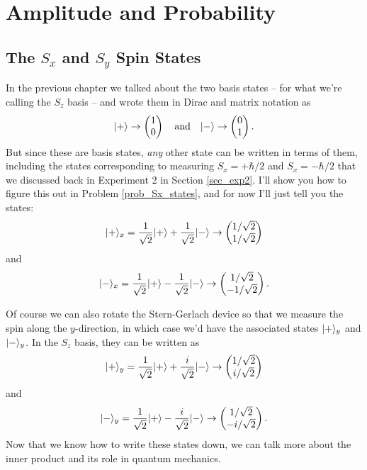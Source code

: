 \chapter{Amplitude and Probability}

\section{The $S_x$ and $S_y$ Spin States}

In the previous chapter we talked about the two basis states -- for what we're calling the $S_z$ basis -- and wrote them in Dirac and matrix notation as
\begin{equation}
| + \rangle \to \begin{pmatrix} 1 \\ 0 \end{pmatrix} \quad \text{and} \quad | - \rangle \to \begin{pmatrix} 0 \\ 1 \end{pmatrix}.
\end{equation}
But since these are basis states, \emph{any} other state can be written in terms of them, including the states corresponding to measuring $S_x = +\hbar/2$ and $S_x = -\hbar/2$ that we discussed back in Experiment 2 in Section \ref{sec_exp2}.  I'll show you how to figure this out in Problem \ref{prob_Sx_states}, and for now I'll just tell you the states:
\begin{equation}
\label{eq_ket_plus_x}
| + \rangle_x = \frac{1}{\sqrt{2}} | + \rangle + \frac{1}{\sqrt{2}} | - \rangle \to \begin{pmatrix} 1/\sqrt{2} \\ 1/\sqrt{2} \end{pmatrix}
\end{equation}
and
\begin{equation}
\label{eq_ket_minus_x}
| - \rangle_x = \frac{1}{\sqrt{2}} | + \rangle - \frac{1}{\sqrt{2}} | - \rangle \to \begin{pmatrix} 1/\sqrt{2} \\ -1/\sqrt{2} \end{pmatrix}.
\end{equation}

Of course we can also rotate the Stern-Gerlach device so that we measure the spin along the $y$-direction, in which case we'd have the associated states $| + \rangle_y$ and $| - \rangle_y$.  In the $S_z$ basis, they can be written as
\begin{equation}
| + \rangle_y = \frac{1}{\sqrt{2}} | + \rangle + \frac{i}{\sqrt{2}} | - \rangle \to \begin{pmatrix} 1/\sqrt{2} \\ i/\sqrt{2} \end{pmatrix}
\end{equation}
and
\begin{equation}
| - \rangle_y = \frac{1}{\sqrt{2}} | + \rangle - \frac{i}{\sqrt{2}} | - \rangle \to \begin{pmatrix} 1/\sqrt{2} \\ -i/\sqrt{2} \end{pmatrix}.
\end{equation}
Now that we know how to write these states down, we can talk more about the inner product and its role in quantum mechanics.

